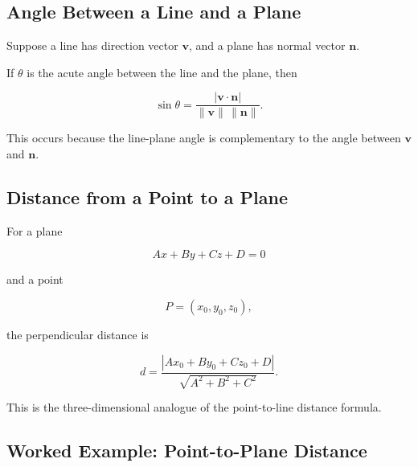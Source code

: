 \subsection{Angle Between a Line and a Plane}
\label{subsec:angle-line-plane}

Suppose a line has direction vector \(\mathbf{v}\), and a plane has normal
vector \(\mathbf{n}\).

If \(\theta\) is the acute angle between the line and the plane, then

\[
\boxed{
\sin\theta
=
\frac{
|\mathbf{v}\cdot\mathbf{n}|
}{
\|\mathbf{v}\|\,\|\mathbf{n}\|
}.
}
\]

This occurs because the line-plane angle is complementary to the angle
between \(\mathbf{v}\) and \(\mathbf{n}\).

\subsection{Distance from a Point to a Plane}
\label{subsec:point-plane-distance}

For a plane

\[ Ax+By+Cz+D=0 \]

and a point

\[ P=(x_0,y_0,z_0), \]

the perpendicular distance is

\begin{theorem}
\[
\boxed{
d
=
\frac{
|Ax_0+By_0+Cz_0+D|
}{
\sqrt{A^2+B^2+C^2}
}.
}
\]
\end{theorem}

This is the three-dimensional analogue of the point-to-line distance formula.

\subsection{Worked Example: Point-to-Plane Distance}
\label{subsec:worked-point-plane-distance}

